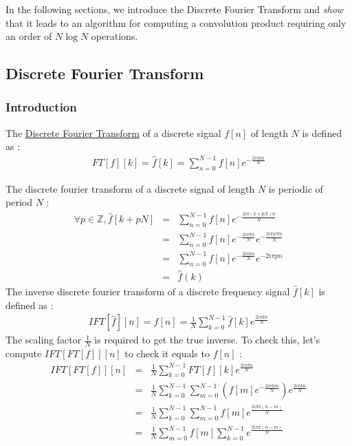 \documentclass[a4paper,10pt,twoside]{article}
\begin{document}
In the following sections, we introduce the Discrete Fourier Transform and \emph{show} that it leads to an algorithm for computing a convolution product requiring only an order of $N \log N$ operations.\\

\subsection{Discrete Fourier Transform}

\subsubsection{Introduction}

The \href{http://en.wikipedia.org/wiki/Discrete_Fourier_transform}{Discrete Fourier Transform} of a discrete signal $f[n]$ of length $N$ is defined as : 
\begin{eqnarray}
\nonumber FT[f][k] = \hat{f}[k] = \sum_{n=0}^{N-1} f[n] e^{-\frac{2 i \pi k n}{N}}
\end{eqnarray}

The discrete fourier transform of a discrete signal of length $N$ is periodic of period $N$ :\\
\begin{eqnarray}
\nonumber \forall p \in \mathbb{Z}, \hat{f}[k+pN] &=& \sum_{n=0}^{N-1} f[n] e^{-\frac{2 i \pi (k+pN) n}{N}} \\
\nonumber                                        &=& \sum_{n=0}^{N-1} f[n] e^{-\frac{2 i \pi k n}{N} }e^{-\frac{2 i \pi p N n}{N}}\\
\nonumber                                        &=& \sum_{n=0}^{N-1} f[n] e^{-\frac{2 i \pi k n}{N}}e^{-2 i \pi p n}\\
\nonumber                                        &=& \hat{f}(k)
\end{eqnarray}
The inverse discrete fourier transform of a discrete frequency signal $\hat{f}[k]$ is defined as :
\begin{eqnarray}
\nonumber IFT[\hat{f}][n] = f[n] = \frac{1}{N} \sum_{k=0}^{N-1} \hat{f}[k] e^{\frac{2i\pi k n}{N}}
\end{eqnarray}
The scaling factor $\frac{1}{N}$ is required to get the true inverse. To check this, let's compute $IFT[FT[f]][n]$ to check it equals to $f[n]$ :
\begin{eqnarray}
\nonumber IFT[FT[f]][n] &=& \frac{1}{N} \sum_{k=0}^{N-1} FT[f][k]  e^{\frac{2i\pi k n}{N}} \\
\nonumber               &=& \frac{1}{N} \sum_{k=0}^{N-1} \sum_{m=0}^{N-1} \left( f[m] e^{-\frac{2 i \pi k m}{N}} \right)  e^{\frac{2i\pi k n}{N}}\\
\nonumber               &=& \frac{1}{N} \sum_{k=0}^{N-1} \sum_{m=0}^{N-1} f[m] e^{\frac{2i\pi k (n-m)}{N}} \\
\nonumber               &=& \frac{1}{N} \sum_{m=0}^{N-1} f[m] \sum_{k=0}^{N-1} e^{\frac{2i\pi k (n-m)}{N}}
\end{eqnarray}
\end{document}
